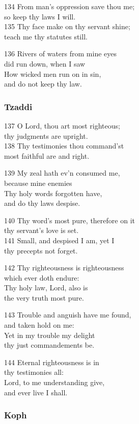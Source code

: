 134 From man’s oppression save thou me;\\
so keep thy laws I will.\\
135 Thy face make on thy servant shine;\\
teach me thy statutes still.

136 Rivers of waters from mine eyes\\
did run down, when I saw\\
How wicked men run on in sin,\\
and do not keep thy law.

\subsubsection*{Tzaddi}

137 O Lord, thou art most righteous;\\
thy judgments are upright.\\
138 Thy testimonies thou command’st\\
most faithful are and right.

139 My zeal hath ev’n consumed me,\\
because mine enemies\\
Thy holy words forgotten have,\\
and do thy laws despise.

140 Thy word’s most pure, therefore on it\\
thy servant’s love is set.\\
141 Small, and despised I am, yet I\\
thy precepts not forget.

142 Thy righteousness is righteousness\\
which ever doth endure:\\
Thy holy law, Lord, also is\\
the very truth most pure.

143 Trouble and anguish have me found,\\
and taken hold on me:\\
Yet in my trouble my delight\\
thy just commandements be.

144 Eternal righteousness is in\\
thy testimonies all:\\
Lord, to me understanding give,\\
and ever live I shall.

\subsubsection*{Koph}

